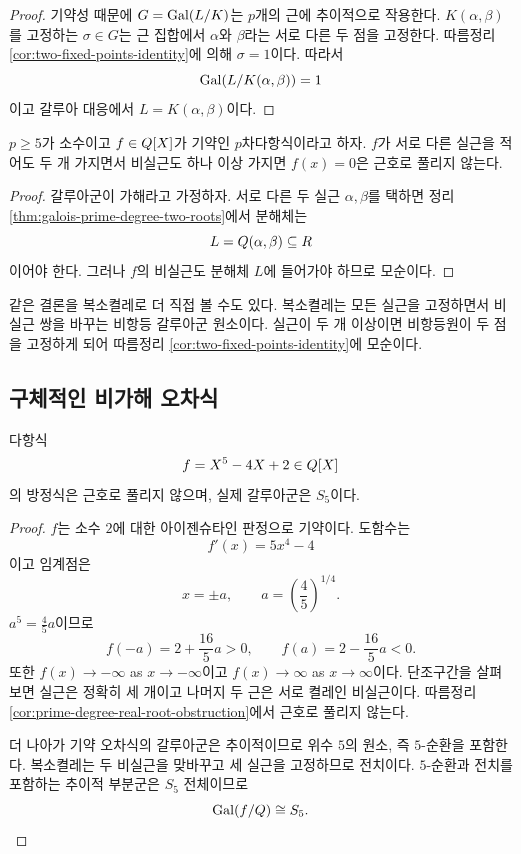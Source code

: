 \begin{proof}
기약성 때문에 $G=\operatorname{Gal}(L/K)$는 $p$개의 근에 추이적으로 작용한다. $K(\alpha,\beta)$를 고정하는 $\sigma\in G$는 근 집합에서 $\alpha$와 $\beta$라는 서로 다른 두 점을 고정한다. 따름정리 \ref{cor:two-fixed-points-identity}에 의해 $\sigma=1$이다. 따라서
\[
  \operatorname{Gal}(L/K(\alpha,\beta))=1
\]
이고 갈루아 대응에서 $L=K(\alpha,\beta)$이다.
\end{proof}

\begin{corollary}
\label{cor:prime-degree-real-root-obstruction}
$p\ge5$가 소수이고 $f\in Q[X]$가 기약인 $p$차다항식이라고 하자. $f$가 서로 다른 실근을 적어도 두 개 가지면서 비실근도 하나 이상 가지면 $f(x)=0$은 근호로 풀리지 않는다.
\end{corollary}

\begin{proof}
갈루아군이 가해라고 가정하자. 서로 다른 두 실근 $\alpha,\beta$를 택하면 정리 \ref{thm:galois-prime-degree-two-roots}에서 분해체는
\[
  L=Q(\alpha,\beta)\subseteq R
\]
이어야 한다. 그러나 $f$의 비실근도 분해체 $L$에 들어가야 하므로 모순이다.
\end{proof}

같은 결론을 복소켤레로 더 직접 볼 수도 있다. 복소켤레는 모든 실근을 고정하면서 비실근 쌍을 바꾸는 비항등 갈루아군 원소이다. 실근이 두 개 이상이면 비항등원이 두 점을 고정하게 되어 따름정리 \ref{cor:two-fixed-points-identity}에 모순이다.

\subsection{구체적인 비가해 오차식}

\begin{example}
\label{ex:quintic-x5-4x+2-unsolvable}
다항식
\[
  f=X^5-4X+2\in Q[X]
\]
의 방정식은 근호로 풀리지 않으며, 실제 갈루아군은 $S_5$이다.
\end{example}

\begin{proof}
$f$는 소수 $2$에 대한 아이젠슈타인 판정으로 기약이다. 도함수는
\[
  f'(x)=5x^4-4
\]
이고 임계점은
\[
  x=\pm a,
  \qquad
  a=\left(\frac45\right)^{1/4}.
\]
$a^5=\frac45a$이므로
\[
  f(-a)=2+\frac{16}{5}a>0,
  \qquad
  f(a)=2-\frac{16}{5}a<0.
\]
또한 $f(x)\to-\infty$ as $x\to-\infty$이고 $f(x)\to\infty$ as $x\to\infty$이다. 단조구간을 살펴보면 실근은 정확히 세 개이고 나머지 두 근은 서로 켤레인 비실근이다. 따름정리 \ref{cor:prime-degree-real-root-obstruction}에서 근호로 풀리지 않는다.

더 나아가 기약 오차식의 갈루아군은 추이적이므로 위수 $5$의 원소, 즉 $5$-순환을 포함한다. 복소켤레는 두 비실근을 맞바꾸고 세 실근을 고정하므로 전치이다. $5$-순환과 전치를 포함하는 추이적 부분군은 $S_5$ 전체이므로
\[
  \operatorname{Gal}(f/Q)\cong S_5.
\]
\end{proof}

